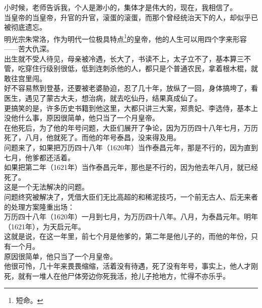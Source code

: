 \begin{multicols}{\theparacolNo}
小时候，老师告诉我，个人是渺小的，集体才是伟大的，现在，我相信了。\\

当皇帝的当皇帝，升官的升官，滚蛋的滚蛋，而那个曾经统治天下的人，却似乎已被彻底遗忘。\\

明光宗朱常洛，作为明代一位极具特点\footnote{短命。}的皇帝，他的人生可以用四个字来形容——苦大仇深。\\

出生就不受人待见，母亲被冷遇，长大了，书读不上，太子立不了，基本算三不管，吃穿住行级别很低，低到连刺杀他的人，都只是个普通农民，拿着根木棍，就敢往宫里闯。\\

好不容易熬到登基，还要被老婆胁迫，忍了几十年，放纵了一回，身体搞垮了，看医生，遇见了蒙古大夫，想治病，就去吃仙丹，结果真成仙了。\\

更搞笑的是，许多历史书籍到他这里，大都只讲三大案，郑贵妃、李选侍，基本上没他什么事，原因很简单，他只当了一个月皇帝。\\

在他死后，为了他的年号问题，大臣们展开了争论，因为万历四十八年七月，万历死了，八月，他就死了。而他的年号泰昌，没来得及用。\\

问题来了，如果把万历四十八年（1620年）当作泰昌元年，那是不行的，因为直到七月，他爹都还活着。\\

如果把第二年（1621年）当作泰昌元年，那也是不行的，因为他去年八月，就已经死了。\\

这是一个无法解决的问题。\\

问题终究被解决了，凭借大臣们无比高超的和稀泥技巧，一个前无古人、后无来者的处理方案隆重出场：\\

万历四十八年（1620年）一月到七月，为万历四十八年。八月，为泰昌元年。明年（1621年），为天启元年。\\

这就是说，在这一年里，前七个月是他爹的，第二年是他儿子的，而他的年份，只有一个月。\\

原因很简单，他只当了一个月皇帝。\\

他很可怜，几十年来畏畏缩缩，活着没有待遇，死了没有年号，事实上，他人才刚死，就有一堆人在他尸体旁边你死我活，抢儿子抢地方，忙得不亦乐乎。\\


\end{multicols}
